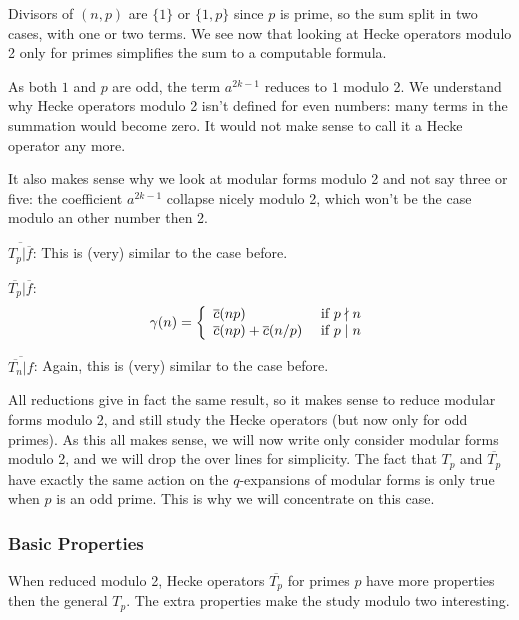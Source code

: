 Divisors of $(n,p)$ are $\{1\}$ or $\{1,p\}$ since $p$ is prime, so the sum split in two cases, with one or two terms.
We see now that looking at Hecke operators modulo 2 only for primes simplifies the sum to a computable formula.

As both $1$ and $p$ are odd, the term $a^{2k-1}$ reduces to $1$ modulo 2.
We understand why Hecke operators modulo 2 isn't defined for even numbers: many terms in the summation would become zero.
It would not make sense to call it a Hecke operator any more.

It also makes sense why we look at modular forms modulo 2 and not say three or five: the coefficient $a^{2k-1}$ collapse nicely modulo 2, which won't be the case modulo an other number then 2.

$\overline{T_p|\overline{f}}$:
This is (very) similar to the case before.

$\overline{T_p}|\overline{f}$:
$$
\gamma(n)
= \left\lbrace
\begin{array}{l l}
  \overline{c}(np)                   & \text{ if } p \nmid n \\
  \overline{c}(np)+\overline{c}(n/p) & \text{ if } p \mid  n
\end{array}
\right.
$$

$\overline{\overline{T_n}|f}$:
Again, this is (very) similar to the case before.

All reductions give in fact the same result, so it makes sense to reduce modular forms modulo 2, and still study the Hecke operators (but now only for odd primes).
As this all makes sense, we will now write only consider modular forms modulo 2, and we will drop the over lines for simplicity.
The fact that $T_p$ and $\overline{T_p}$ have exactly the same action on the $q$-expansions of modular forms is only true when $p$ is an odd prime.
This is why we will concentrate on this case.

\subsubsection{Basic Properties}
When reduced modulo 2, Hecke operators $\overline{T_p}$ for primes $p$ have more properties then the general $T_p$.
The extra properties make the study modulo two interesting.

